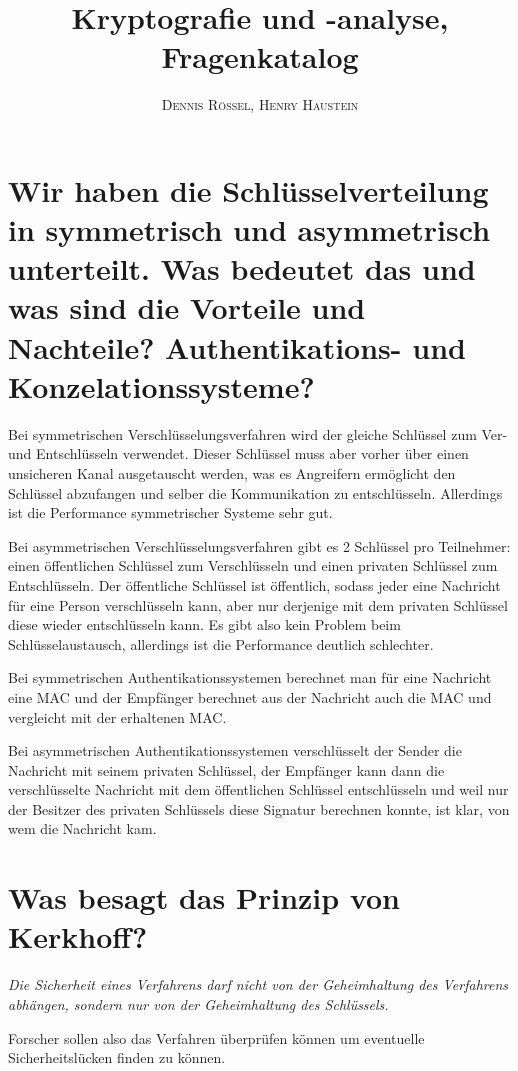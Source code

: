 \documentclass{article}
\title{\textbf{Kryptografie und -analyse, Fragenkatalog}}
\author{\textsc{Dennis Rössel}, \textsc{Henry Haustein}}
\date{}
\begin{document}
	\maketitle
	
	\section*{Wir haben die Schlüsselverteilung in symmetrisch und asymmetrisch unterteilt. Was bedeutet das und was sind die Vorteile und Nachteile? Authentikations- und Konzelationssysteme?}
	
	Bei symmetrischen Verschlüsselungsverfahren wird der gleiche Schlüssel zum Ver- und Entschlüsseln verwendet. Dieser Schlüssel muss aber vorher über einen unsicheren Kanal ausgetauscht werden, was es Angreifern ermöglicht den Schlüssel abzufangen und selber die Kommunikation zu entschlüsseln. Allerdings ist die Performance symmetrischer Systeme sehr gut.
	
	Bei asymmetrischen Verschlüsselungsverfahren gibt es 2 Schlüssel pro Teilnehmer: einen öffentlichen Schlüssel zum Verschlüsseln und einen privaten Schlüssel zum Entschlüsseln. Der öffentliche Schlüssel ist öffentlich, sodass jeder eine Nachricht für eine Person verschlüsseln kann, aber nur derjenige mit dem privaten Schlüssel diese wieder entschlüsseln kann. Es gibt also kein Problem beim Schlüsselaustausch, allerdings ist die Performance deutlich schlechter.
	
	Bei symmetrischen Authentikationssystemen berechnet man für eine Nachricht eine MAC und der Empfänger berechnet aus der Nachricht auch die MAC  und vergleicht mit der erhaltenen MAC. 
	
	Bei asymmetrischen Authentikationssystemen verschlüsselt der Sender die Nachricht mit seinem privaten Schlüssel, der Empfänger kann dann die verschlüsselte Nachricht mit dem öffentlichen Schlüssel entschlüsseln und weil nur der Besitzer des privaten Schlüssels diese Signatur berechnen konnte, ist klar, von wem die Nachricht kam.
	
	\section*{Was besagt das Prinzip von Kerkhoff?}
	
	\textit{Die Sicherheit eines Verfahrens darf nicht von der Geheimhaltung des Verfahrens abhängen, sondern nur von der Geheimhaltung des Schlüssels.}
	
	Forscher sollen also das Verfahren überprüfen können um eventuelle Sicherheitslücken finden zu können.
	
\end{document}
